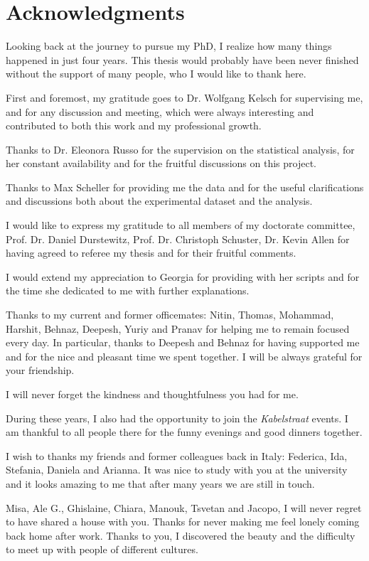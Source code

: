 \chapter*{Acknowledgments}
\markboth{}{}
Looking back at the journey to pursue my PhD, I realize how many things happened in just four years. This thesis would probably have been never finished without the support of many people, who I would like to thank here.  

First and foremost, my gratitude goes to Dr. Wolfgang Kelsch for supervising me, and for any discussion and meeting, which were always interesting and contributed to both this work and my professional growth. 

Thanks to Dr. Eleonora Russo for the supervision on the statistical analysis, for her constant availability and for the fruitful discussions on this project.

Thanks to Max Scheller for providing me the data and for the useful clarifications and discussions both about the experimental dataset and the analysis.


I would like to express my gratitude to all members of my doctorate committee, Prof. Dr. Daniel Durstewitz, Prof. Dr. Christoph Schuster, Dr. Kevin Allen for having agreed to referee my thesis and for their fruitful comments.  

I would extend my appreciation to Georgia for providing with her scripts and for the time she dedicated to me with further explanations.


Thanks to my current and former officemates: Nitin, Thomas, Mohammad, Harshit, Behnaz, Deepesh, Yuriy and Pranav for helping me to remain focused every day.
In particular, thanks to Deepesh and Behnaz for having supported me and for the nice and pleasant time we spent together. I will be always grateful for your friendship. 

I will never forget the kindness and thoughtfulness you had for me.



During these years, I also had the opportunity to join the \emph{Kabelstraat} events. I am thankful to all people there for the funny evenings and good dinners together.

I wish to thanks my friends and former colleagues back in Italy: Federica, Ida, Stefania, Daniela and Arianna. It was nice to study with you at the university and it looks amazing to me that after many years we are still in touch.

Misa, Ale G., Ghislaine, Chiara, Manouk, Tsvetan and Jacopo, I will never regret to have shared a house with you. Thanks for never making me feel lonely coming back home after work. Thanks to you, I discovered the beauty and the difficulty to meet up with people of different cultures.

